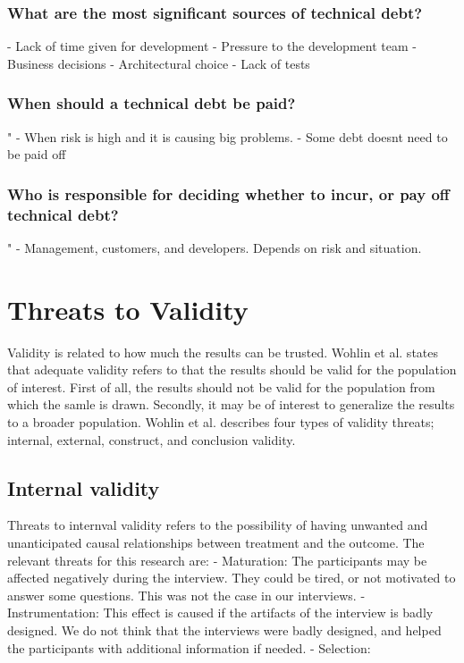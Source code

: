 \subsubsection{What are the most significant sources of technical debt?}
- Lack of time given for development
- Pressure to the development team
- Business decisions
- Architectural choice
- Lack of tests

\subsubsection{When should a technical debt be paid?}"
- When risk is high and it is causing big problems.
- Some debt doesnt need to be paid off


\subsubsection{Who is responsible for deciding whether to incur, or pay off technical debt?}"
- Management, customers, and developers. Depends on risk and situation.


\section{Threats to Validity}
Validity is related to how much the results can be trusted\cite{Wohlin:2000:ESE:330775}. Wohlin et al.\cite{Wohlin:2000:ESE:330775} states that adequate validity refers to that the results should be valid for the population of interest. First of all, the results should not be valid for the population from which the samle is drawn. Secondly, it may be of interest to generalize the results to a broader population. Wohlin et al.\cite{Wohlin:2000:ESE:330775} describes four types of validity threats; internal, external, construct, and conclusion validity.

\subsection{Internal validity}
Threats to internval validity refers to the possibility of having unwanted and unanticipated causal relationships between treatment and the outcome. The relevant threats for this research are:
- Maturation: The participants may be affected negatively during the interview. They could be tired, or not motivated to answer some questions. This was not the case in our interviews.
- Instrumentation: This effect is caused if the artifacts of the interview is badly designed. We do not think that the interviews were badly designed, and helped the participants with additional information if needed.
- Selection: 


